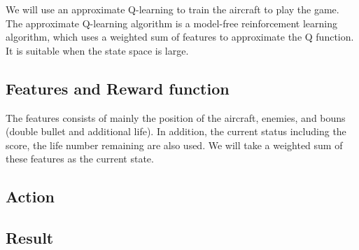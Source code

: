 \documentclass{article}
\begin{document}

    We will use an approximate Q-learning to train the aircraft to play the game. The approximate Q-learning algorithm is a model-free reinforcement learning algorithm, which uses a weighted sum of features to approximate the Q function. It is suitable when the state space is large. 

    \subsection{Features and Reward function}

    The features consists of mainly the position of the aircraft, enemies, and bouns (double bullet and additional life). In addition, the current status including the score, the life number remaining are also used. We will take a weighted sum of these features as the current state.


    \subsection{Action}



\subsection{Result}

\appendix
\end{document}
